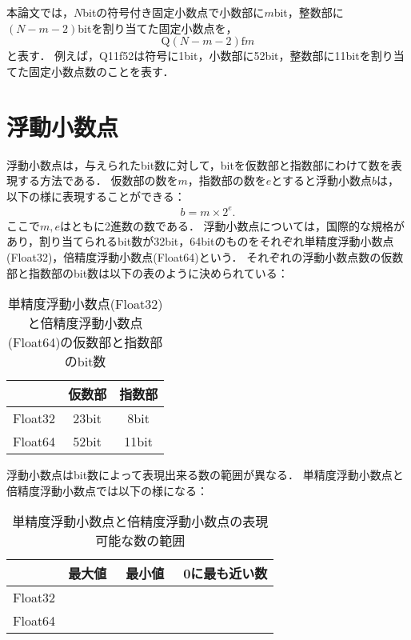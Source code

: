 本論文では，$N$bitの符号付き固定小数点で小数部に$m$bit，整数部に$(N-m-2)$bitを割り当てた固定小数点を，
\begin{equation}
    \text{Q}(N-m-2)\text{f}m
\end{equation}
と表す．
例えば，Q11f52は符号に1bit，小数部に52bit，整数部に11bitを割り当てた固定小数点数のことを表す．
\section{浮動小数点}
浮動小数点は，与えられたbit数に対して，bitを仮数部と指数部にわけて数を表現する方法である．
仮数部の数を$m$，指数部の数を$e$とすると浮動小数点$b$は，以下の様に表現することができる：
\begin{align}
    b = m \times 2^e.
\end{align}
ここで$m,e$はともに2進数の数である．
浮動小数点については，国際的な規格があり，割り当てられるbit数が32bit，64bitのものをそれぞれ単精度浮動小数点(Float32)，倍精度浮動小数点(Float64)という．
それぞれの浮動小数点数の仮数部と指数部のbit数は以下の表のように決められている：
\begin{table}[H]
    \centering
    \caption{単精度浮動小数点(Float32)と倍精度浮動小数点(Float64)の仮数部と指数部のbit数}
    \begin{tabular}{c|c|c}   
     & 仮数部 & 指数部 \\ \hline
    Float32 & 23bit & 8bit \\ 
    Float64 & 52bit & 11bit
    \end{tabular}
    \label{tab:Float32_Float64_bit}
\end{table}
浮動小数点はbit数によって表現出来る数の範囲が異なる．
単精度浮動小数点と倍精度浮動小数点では以下の様になる：
\begin{table}[H]
    \centering
    \caption{単精度浮動小数点と倍精度浮動小数点の表現可能な数の範囲}
    \begin{tabular}{c|c|c|c}   
     & 最大値 & 最小値　& 0に最も近い数 \\ \hline
    Float32 & & & \\
    Float64 & & &
    \end{tabular}
    \label{tab:Float32_Float64_range}
\end{table}
